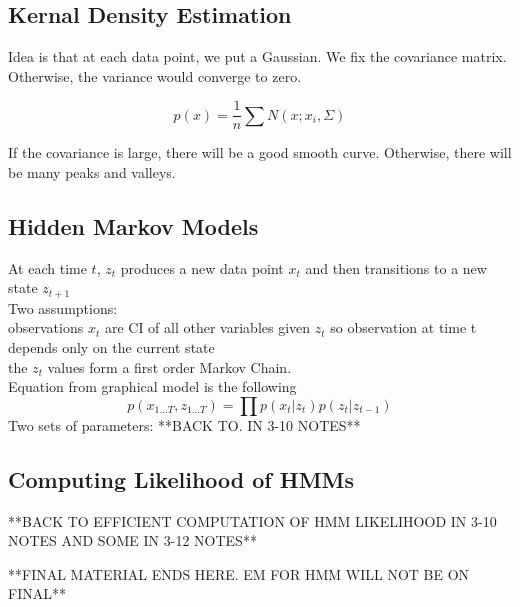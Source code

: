 \documentclass[11pt,psfig]{article}
\begin{document}
\subsection*{Kernal Density Estimation}

Idea is that at each data point, we put a Gaussian. We fix the covariance matrix. Otherwise, the variance would converge to zero. 

\[
p(x) = \frac{1}{n} \sum{N(x;x_i,\Sigma)}
\]

If the covariance is large, there will be a good smooth curve. Otherwise, there will be many peaks and valleys. 

\subsection*{Hidden Markov Models}

At each time $t$, $z_t$ produces a new data point $x_t$ and then transitions to a new state $z_{t+1}$\\
Two assumptions:
\\
observations $x_t$ are CI of all other variables given $z_t$ so observation at time t depends only on the current state
\\
the $z_t$ values form a first order Markov Chain.\\
Equation from graphical model is the following
\[
p(x_{1...T},z_{1...T}) = \prod p(x_t|z_t)p(z_t|z_{t-1})
\]
Two sets of parameters:
**BACK TO. IN 3-10 NOTES**
\\

\subsection*{Computing Likelihood of HMMs}

**BACK TO EFFICIENT COMPUTATION OF HMM LIKELIHOOD IN 3-10 NOTES AND SOME IN 3-12 NOTES**

**FINAL MATERIAL ENDS HERE. EM FOR HMM WILL NOT BE ON FINAL**
\end{document}
